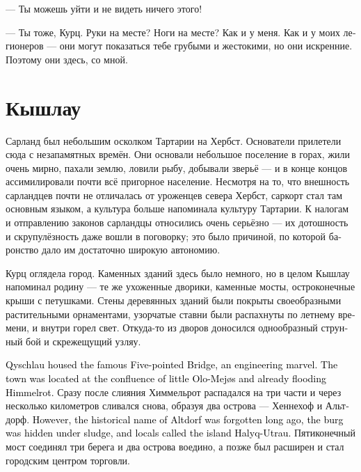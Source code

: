 \documentclass[a4paper,12pt,fleqn]{book}\usepackage{cooltooltips}\usepackage{polyglossia}\setdefaultlanguage[babelshorthands=true]{russian}\setotherlanguage{english}\defaultfontfeatures{Ligatures=TeX,Mapping=tex-text} \usepackage{xcolor}\definecolor{lightgray}{HTML}{bbbbbb}\color{lightgray}\newcommand{\ml}[3]{\textenglish{\textcolor{black}{#3}}}
\begin{document}
--- Ты можешь уйти и не видеть ничего этого!

--- Ты тоже, Курц.
Руки на месте?
Ноги на месте?
Как и у меня.
Как и у моих легионеров --- они могут показаться тебе грубыми и жестокими, но они искренние.
Поэтому они здесь, со мной.

\section{Кышлау}

Сарланд был небольшим осколком Тартарии на Хербст.
Основатели прилетели сюда с незапамятных времён.
Они основали небольшое поселение в горах, жили очень мирно, пахали землю, ловили рыбу, добывали зверьё --- и в конце концов ассимилировали почти всё пригорное население.
Несмотря на то, что внешность сарландцев почти не отличалась от уроженцев севера Хербст, саркорт стал там основным языком, а культура больше напоминала культуру Тартарии.
К налогам и отправлению законов сарландцы относились очень серьёзно --- их дотошность и скрупулёзность даже вошли в поговорку;
это было причиной, по которой баронство дало им достаточно широкую автономию.

Курц оглядела город.
Каменных зданий здесь было немного, но в целом Кышлау напоминал родину --- те же ухоженные дворики, каменные мосты, остроконечные крыши с петушками.
Стены деревянных зданий были покрыты своеобразными растительными орнаментами, узорчатые ставни были распахнуты по летнему времени, и внутри горел свет.
Откуда-то из дворов доносился однообразный струнный бой и скрежещущий узляу.

\ml{$0$}
{В Кышлау находился знаменитый Пятиконечный мост --- чудо инженерного искусства.}
{Qyschlau housed the famous Five-pointed Bridge, an engineering marvel.}
\ml{$0$}
{Город находился в месте слияния маленького Оло-Мейяса и успевшего стать полноводным Химмельрота.}
{The town was located at the confluence of little Olo-Mej\o{}s and already flooding Himmelrot.}
Сразу после слияния Химмельрот распадался на три части и через несколько километров сливался снова, образуя два острова --- Хеннехоф и Альтдорф.
\ml{$0$}
{Впрочем, историческое название Альтдорфа давно забыли, городище скрылось под слоем ила, и местные называли его Хазлык-Утрау.}
{However, the historical name of Altdorf was forgotten long ago, the burg was hidden under sludge, and locals called the island Ha\dh{}lyq-Utrau.}
Пятиконечный мост соединял три берега и два острова воедино, а позже был расширен и стал городским центром торговли.
\end{document}
